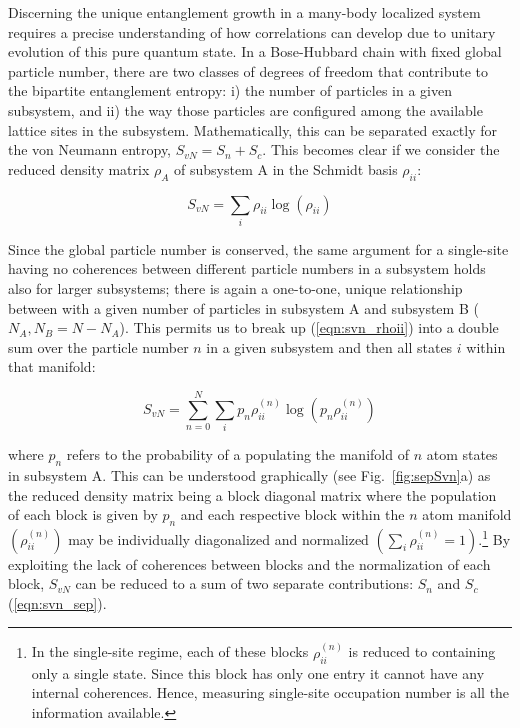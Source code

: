 Discerning the unique entanglement growth in a many-body localized system requires a precise understanding of how correlations can develop due to unitary evolution of this pure quantum state. In a Bose-Hubbard chain with fixed global particle number, there are two classes of degrees of freedom that contribute to the bipartite entanglement entropy: i) the number of particles in a given subsystem, and ii) the way those particles are configured among the available lattice sites in the subsystem. Mathematically, this can be separated exactly for the von Neumann entropy, $S_{vN} = S_n + S_c$. This becomes clear if we consider the reduced density matrix $\rho_A$ of subsystem A in the Schmidt basis $\rho_{ii}$:

\begin{equation}
\label{eqn:svn_rhoii}
S_{vN} = \sum_i \rho_{ii} \log \left( \rho_{ii} \right)
\end{equation}

Since the global particle number is conserved, the same argument for a single-site having no coherences between different particle numbers in a subsystem holds also for larger subsystems; there is again a one-to-one, unique relationship between with a given number of particles in subsystem A and subsystem B ($N_A, N_B=N-N_A$). This permits us to break up (\ref{eqn:svn_rhoii}) into a double sum over the particle number $n$ in a given subsystem and then all states $i$ within that manifold:

\begin{equation}
\label{eqn:svn_blk}
S_{vN} = \sum_{n=0}^N \sum_i p_n \rho^{(n)}_{ii} \log \left ( p_n \rho^{(n)}_{ii} \right )
\end{equation}

where $p_n$ refers to the probability of a populating the manifold of $n$ atom states in subsystem A. This can be understood graphically (see Fig.~\ref{fig:sepSvn}a) as the reduced density matrix being a block diagonal matrix where the population of each block is given by $p_n$ and each respective block within the $n$ atom manifold $\left ( \rho^{(n)}_{ii} \right )$ may be individually diagonalized and normalized $\left ( \sum_i \rho^{(n)}_{ii} = 1\right )$.\footnote{In the single-site regime, each of these blocks $\rho^{(n)}_{ii}$ is reduced to containing only a single state. Since this block has only one entry it cannot have any internal coherences. Hence, measuring single-site occupation number is all the information available.} By exploiting the lack of coherences between blocks and the normalization of each block, $S_{vN}$ can be reduced to a sum of two separate contributions: $S_n$ and $S_c$ (\ref{eqn:svn_sep}).

